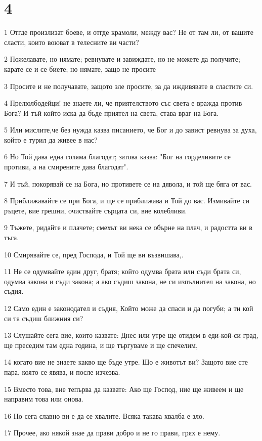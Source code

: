 \chapter{4}

\par 1 Отгде произлизат боеве, и отгде крамоли, между вас? Не от там ли, от вашите сласти, които воюват в телесните ви части?
\par 2 Пожелавате, но нямате; ревнувате и завиждате, но не можете да получите; карате се и се биете; но нямате, защо не просите
\par 3 Просите и не получавате, защото зле просите, за да иждивявате в сластите си.
\par 4 Прелюлбодейци! не знаете ли, че приятелството със света е вражда против Бога? И тъй който иска да бъде приятел на света, става враг на Бога.
\par 5 Или мислите,че без нужда казва писанието, че Бог и до завист ревнува за духа, който е турил да живее в нас?
\par 6 Но Той дава една голяма благодат; затова казва: "Бог на горделивите се противи, а на смирените дава благодат".
\par 7 И тъй, покорявай се на Бога, но противете се на дявола, и той ще бяга от вас.
\par 8 Приближавайте се при Бога, и ще се приближава и Той до вас. Измивайте си ръцете, вие грешни, очиствайте сърцата си, вие колебливи.
\par 9 Тъжете, ридайте и плачете; смехът ви нека се обърне на плач, и радостта ви в тъга.
\par 10 Смирявайте се, пред Господа, и Той ще ви възвишава,.
\par 11 Не се одумвайте един друг, братя; който одумва брата или съди брата си, одумва закона и съди закона; а ако съдиш закона, не си изпълнител на закона, но съдия.
\par 12 Само един е законодател и съдия, Който може да спаси и да погуби; а ти кой си та съдиш ближния си?
\par 13 Слушайте сега вие, които казвате: Днес или утре ще отидем в еди-кой-си град, ще преседим там една година, и ще търгуваме и ще спечелим,
\par 14 когато вие не знаете какво ще бъде утре. Що е животът ви? Защото вие сте пара, която се явява, и после изчезва.
\par 15 Вместо това, вие тепърва да казвате: Ако ще Господ, ние ще живеем и ще направим това или онова.
\par 16 Но сега славно ви е да се хвалите. Всяка такава хвалба е зло.
\par 17 Прочее, ако някой знае да прави добро и не го прави, грях е нему.

